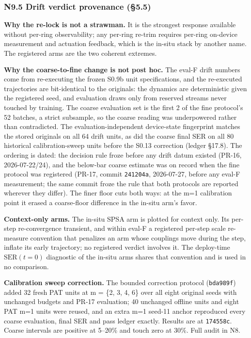 \documentclass[
  10pt,
]{article}
\begin{document}
\subsubsection{N9.5 Drift verdict provenance
(§5.5)}\label{n9.5-drift-verdict-provenance-5.5}

\textbf{Why the re-lock is not a strawman.} It is the strongest response
available without per-ring observability; any per-ring re-trim requires
per-ring on-device measurement and actuation feedback, which is the
in-situ stack by another name. The registered arms are the two coherent
extremes.

\textbf{Why the coarse-to-fine change is not post hoc.} The eval-F drift
numbers come from re-executing the frozen S0.9b unit specifications, and
the re-executed trajectories are bit-identical to the originals: the
dynamics are deterministic given the registered seed, and evaluation
draws only from reserved streams never touched by training. The coarse
evaluation set is the first 2 of the fine protocol's 52 batches, a
strict subsample, so the coarse reading was underpowered rather than
contradicted. The evaluation-independent device-state fingerprint
matches the stored originals on all 64 drift units, as did the coarse
final SER on all 80 historical calibration-sweep units before the S0.13
correction (ledger §17.8). The ordering is dated: the decision rule
froze before any drift datum existed (PR-16, 2026-07-22/24), and the
below-bar coarse estimate was on record when the fine protocol was
registered (PR-17, commit \texttt{241204a}, 2026-07-27, before any
eval-F measurement; the same commit froze the rule that both protocols
are reported wherever they differ). The finer floor cuts both ways: at
the m=1 calibration point it erased a coarse-floor difference in the
in-situ arm's favor.

\textbf{Context-only arms.} The in-situ SPSA arm is plotted for context
only. Its per-step re-convergence transient, and within eval-F a
registered per-step scale re-measure convention that penalizes an arm
whose couplings move during the step, inflate its early trajectory; no
registered verdict involves it. The deploy-time \(\mathrm{SER}(t{=}0)\)
diagnostic of the in-situ arms shares that convention and is used in no
comparison.

\textbf{Calibration sweep correction.} The bounded correction protocol
(\texttt{bda989f}) added 32 fresh PAT units at m = \{2, 3, 4, 6\} over
all eight original seeds with unchanged budgets and PR-17 evaluation; 40
unchanged offline units and eight PAT m=1 units were reused, and an
extra m=1 seed-11 anchor reproduced every coarse evaluation, final SER
and pass ledger exactly. Results are at \texttt{174558c}. Coarse
intervals are positive at 5--20\% and touch zero at 30\%. Full audit in
N8.
\end{document}
